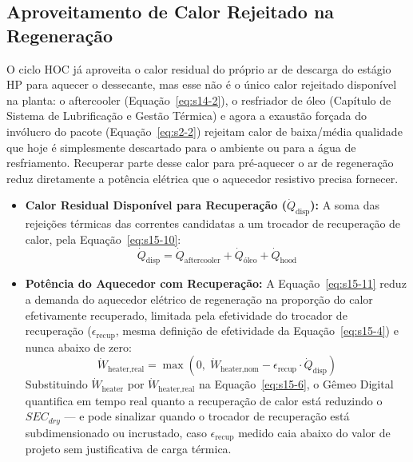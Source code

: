 \documentclass[12pt,a4paper]{article}
\numberwithin{equation}{section}
\numberwithin{table}{section}
\numberwithin{figure}{section}
\begin{document}
{		\subsection{\textbf{Aproveitamento de Calor Rejeitado na Regeneração}}
		O ciclo HOC já aproveita o calor residual do próprio ar de descarga do estágio HP para aquecer o dessecante, mas esse não é o único calor rejeitado disponível na planta: o aftercooler (Equação~\eqref{eq:s14-2}), o resfriador de óleo (Capítulo de Sistema de Lubrificação e Gestão Térmica) e agora a exaustão forçada do invólucro do pacote (Equação~\eqref{eq:s2-2}) rejeitam calor de baixa/média qualidade que hoje é simplesmente descartado para o ambiente ou para a água de resfriamento. Recuperar parte desse calor para pré-aquecer o ar de regeneração reduz diretamente a potência elétrica que o aquecedor resistivo precisa fornecer.
		\begin{itemize}
			\item \textbf{Calor Residual Disponível para Recuperação ($\dot{Q}_{\text{disp}}$):} A soma das rejeições térmicas das correntes candidatas a um trocador de recuperação de calor, pela Equação~\eqref{eq:s15-10}:
			\begin{equation}\label{eq:s15-10}
\dot{Q}_{\text{disp}} = \dot{Q}_{\text{aftercooler}} + \dot{Q}_{\text{óleo}} + \dot{Q}_{\text{hood}}
\end{equation}
			\item \textbf{Potência do Aquecedor com Recuperação:} A Equação~\eqref{eq:s15-11} reduz a demanda do aquecedor elétrico de regeneração na proporção do calor efetivamente recuperado, limitada pela efetividade do trocador de recuperação ($\epsilon_{\text{recup}}$, mesma definição de efetividade da Equação~\eqref{eq:s15-4}) e nunca abaixo de zero:
			\begin{equation}\label{eq:s15-11}
\dot{W}_{\text{heater,real}} = \max\left(0,\; \dot{W}_{\text{heater,nom}} - \epsilon_{\text{recup}} \cdot \dot{Q}_{\text{disp}}\right)
\end{equation}
			Substituindo $\dot{W}_{\text{heater}}$ por $\dot{W}_{\text{heater,real}}$ na Equação~\eqref{eq:s15-6}, o Gêmeo Digital quantifica em tempo real quanto a recuperação de calor está reduzindo o $SEC_{dry}$ — e pode sinalizar quando o trocador de recuperação está subdimensionado ou incrustado, caso $\epsilon_{\text{recup}}$ medido caia abaixo do valor de projeto sem justificativa de carga térmica.
		\end{itemize}

}
\end{document}

